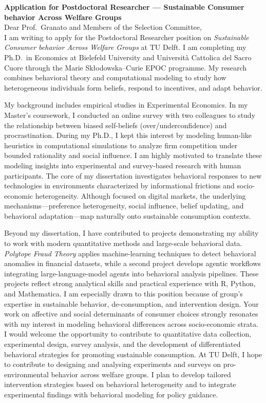 \documentclass[11pt]{article}
\begin{document}
\noindent
\textbf{Application for Postdoctoral Researcher — Sustainable Consumer behavior Across Welfare Groups} \\[1mm]

\noindent Dear Prof.\ Granato and Members of the Selection Committee, \\[1mm]

I am writing to apply for the Postdoctoral Researcher position on \textit{Sustainable Consumer behavior Across Welfare Groups} at TU Delft. I am completing my Ph.D.\ in Economics at Bielefeld University and Università Cattolica del Sacro Cuore through the Marie Skłodowska–Curie EPOC programme. My research combines behavioral theory and computational modeling to study how heterogeneous individuals form beliefs, respond to incentives, and adapt behavior.

My background includes empirical studies in Experimental Economics. In my Master's coursework, I conducted an online survey with two colleagues to study the relationship between biased self-beliefs (over/underconfidence) and procrastination. During my Ph.D., I kept this interest by modeling human-like heuristics in computational simulations to analyze firm competition under bounded rationality and social influence. I am highly motivated to translate these modeling insights into experimental and survey-based research with human participants.
The core of my dissertation investigates behavioral responses to new technologies in environments characterized by informational frictions and socio-economic heterogeneity. Although focused on digital markets, the underlying mechanisms—preference heterogeneity, social influence, belief updating, and behavioral adaptation—map naturally onto sustainable consumption contexts. 

Beyond my dissertation, I have contributed to projects demonstrating my ability to work with modern quantitative methods and large-scale behavioral data. \textit{Polytope Fraud Theory} applies machine-learning techniques to detect behavioral anomalies in financial datasets, while a second project develops agentic workflows integrating large-language-model agents into behavioral analysis pipelines. These projects reflect strong analytical skills and practical experience with R, Python, and Mathematica. I am especially drawn to this position because of group’s expertise in sustainable behavior, de-consumption, and intervention design. Your work on affective and social determinants of consumer choices strongly resonates with my interest in modeling behavioral differences across socio-economic strata. I would welcome the opportunity to contribute to quantitative data collection, experimental design, survey analysis, and the development of differentiated behavioral strategies for promoting sustainable consumption.
At TU Delft, I hope to contribute to designing and analysing experiments and surveys on pro-environmental behavior across welfare groups. I plan to develop tailored intervention strategies based on behavioral heterogeneity and to integrate experimental findings with behavioral modeling for policy guidance.
\end{document}
